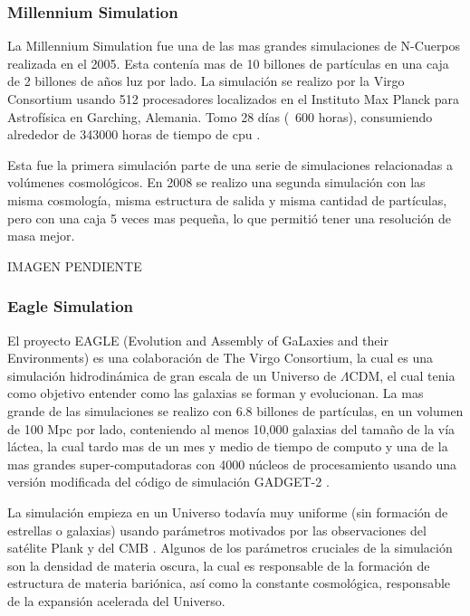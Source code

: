 \subsubsection{Millennium Simulation}

La Millennium Simulation fue una de las mas grandes simulaciones de N-Cuerpos realizada en el 2005. Esta contenía mas de 10 billones de partículas en una caja de 2 billones de años luz por lado. La simulación se realizo por la Virgo Consortium usando 512 procesadores localizados en el Instituto Max Planck para Astrofísica en Garching, Alemania. Tomo 28 días (~600 horas), consumiendo alrededor  de  343000 horas de tiempo de cpu \cite{2005Natur.435..629S}.

Esta fue la primera simulación parte de una serie de simulaciones relacionadas a volúmenes cosmológicos. En 2008 se realizo una segunda simulación con las misma cosmología, misma estructura de salida y misma cantidad de partículas, pero con una caja 5 veces mas pequeña, lo que permitió tener una resolución de masa mejor.

{\LARGE
IMAGEN PENDIENTE
}

\subsubsection{Eagle Simulation}
El proyecto EAGLE (Evolution and Assembly of GaLaxies and their Environments)  es una colaboración de The Virgo Consortium, la cual es una simulación hidrodinámica de gran escala de un Universo de $\Lambda$CDM, el cual tenia como objetivo entender como las galaxias se forman y evolucionan. La mas grande de las simulaciones se realizo con  6.8 billones de partículas, en un volumen de 100 Mpc por lado, conteniendo al menos 10,000 galaxias del tamaño de la vía láctea, la cual tardo mas de un mes y medio de tiempo de computo y una de la mas grandes super-computadoras con 4000 núcleos de procesamiento usando una versión modificada del código de simulación GADGET-2 \cite{2015MNRAS.450.1937C, 2015MNRAS.446..521S}.

La simulación empieza en un Universo todavía muy uniforme (sin formación de estrellas o galaxias) usando parámetros motivados por las observaciones del satélite Plank y del CMB \cite{ 2013ApJS..208...20B, 2020A&A...641A...1P}. Algunos de los parámetros cruciales de la simulación son la densidad de materia oscura, la cual es responsable de la formación de estructura de materia bariónica, así como la constante cosmológica, responsable de la expansión acelerada del Universo.

